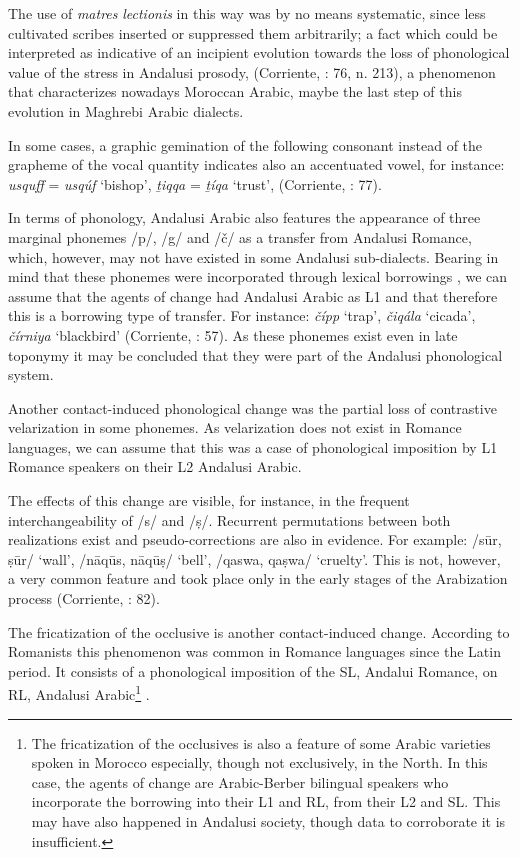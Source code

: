 \documentclass[output=paper,modfonts,nonflat]{langsci/langscibook}
\begin{document}
The use of \textit{matres} \textit{lectionis} in this way was by no means systematic, since {less cultivated scribes inserted or suppressed them arbitrarily}; a fact which could be interpreted as indicative of an incipient evolution towards the loss of phonological value of the stress in Andalusi prosody, (Corriente, \citealt{PereiraVicente2015}: 76, n. 213), a phenomenon that characterizes nowadays Moroccan Arabic, maybe the last step of this evolution in Maghrebi Arabic dialects.

{In some cases, a graphic gemination of the following consonant instead of the grapheme of the vocal quantity indicates also an accentuated vowel, for instance: \textit{usquff} = \textit{usqúf} ‘bishop’, \textit{ṯiqqa} = \textit{ṯíqa} ‘trust’,} {(Corriente, \citealt{PereiraVicente2015}: 77)}{.} 

In terms of phonology, Andalusi Arabic also features the appearance of three marginal phonemes /p/, /g/ and /č/ as a transfer from Andalusi Romance, which, however, may not have existed in some Andalusi sub-dialects. Bearing in mind that these phonemes were incorporated through lexical borrowings \citep{Corriente1978}, we can assume that the agents of change had Andalusi Arabic as L1 and that therefore this is a borrowing type of transfer. For instance: \textit{čípp} ‘trap’, \textit{čiqála} ‘cicada’, \textit{čírniya} ‘blackbird’ (Corriente, \citealt{PereiraVicente2015}: 57). As these phonemes exist even in late toponymy it may be concluded that they were part of the Andalusi phonological system. 

Another contact-induced phonological change was the partial loss of contrastive velarization in some phonemes. As velarization does not exist in Romance languages, we can assume that this was a case of phonological imposition by L1 Romance speakers on their L2 Andalusi Arabic. 

The effects of this change are visible, for instance, in the frequent interchangeability of /s/ and /ṣ/. Recurrent permutations between both realizations exist and pseudo-corrections are also in evidence. For example: /sūr, ṣūr/ ‘wall’, /nāqūs, nāqūṣ/ ‘bell’, /qaswa, qaṣwa/ ‘cruelty’. This is not, however, a very common feature and took place only in the early stages of the Arabization process (Corriente, \citealt{PereiraVicente2015}: 82). 

The fricatization of the occlusive is another contact-induced change. According to Romanists this phenomenon was common in Romance languages since the Latin period. It consists of a phonological imposition of the SL, Andalui Romance, on RL, Andalusi Arabic\footnote{The fricatization of the occlusives is also a feature of some Arabic varieties spoken in Morocco especially, though not exclusively, in the North. In this case, the agents of change are Arabic-Berber bilingual speakers who incorporate the borrowing into their L1 and RL, from their L2 and SL. This may have also happened in Andalusi society, though data to corroborate it is insufficient.} . 
\end{document}

